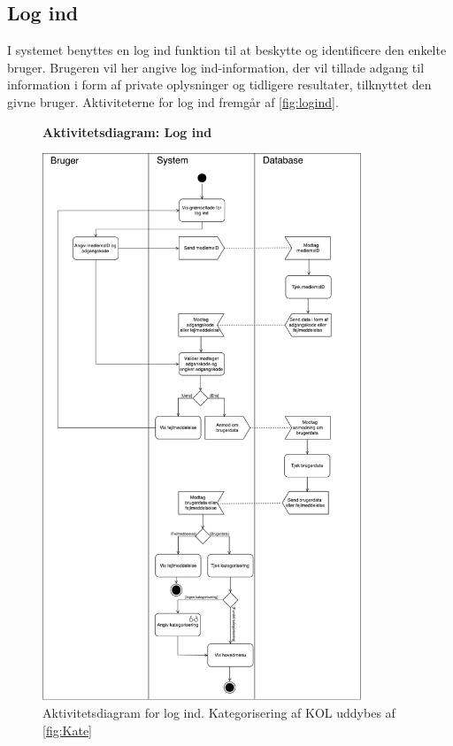 \subsection*{Log ind}
I systemet benyttes en log ind funktion til at beskytte og identificere den enkelte bruger. Brugeren vil her angive log ind-information, der vil tillade adgang til information i form af private oplysninger og tidligere resultater, tilknyttet den givne bruger. Aktiviteterne for log ind fremgår af \autoref{fig:logind}.    


\begin{figure} [H]
\centering
\textbf{Aktivitetsdiagram: Log ind}\par\medskip
\includegraphics[width=0.85\textwidth]{figures/aktivitetsdiagram/Logind}
\caption{Aktivitetsdiagram for log ind. Kategorisering af KOL uddybes af \autoref{fig:Kate}}
\label{fig:logind}
\end{figure}

